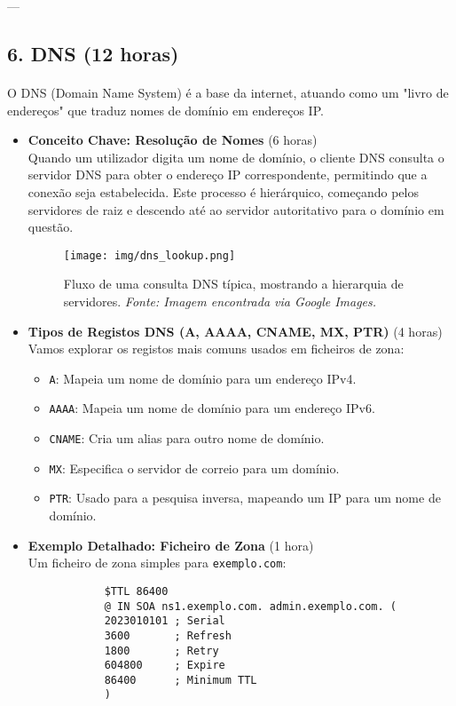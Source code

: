 \documentclass[10pt,a4paper]{article}
\begin{document}
	---
	
	\subsection*{6. DNS (12 horas)}
	\vspace{-1.2em}
	\paragraph{}
	O DNS (Domain Name System) é a base da internet, atuando como um "livro de endereços" que traduz nomes de domínio em endereços IP.
	
	\begin{itemize}
		\item \textbf{Conceito Chave: Resolução de Nomes} (6 horas) \\
		Quando um utilizador digita um nome de domínio, o cliente DNS consulta o servidor DNS para obter o endereço IP correspondente, permitindo que a conexão seja estabelecida. Este processo é hierárquico, começando pelos servidores de raiz e descendo até ao servidor autoritativo para o domínio em questão.
		
		\begin{figure}[h]
			\centering
			\texttt{[image: img/dns\_lookup.png]}
			\caption{Fluxo de uma consulta DNS típica, mostrando a hierarquia de servidores. \textit{Fonte: Imagem encontrada via Google Images.}}
			\label{fig:dns_lookup}
		\end{figure}
		
		\item \textbf{Tipos de Registos DNS (A, AAAA, CNAME, MX, PTR)} (4 horas) \\
		Vamos explorar os registos mais comuns usados em ficheiros de zona:
		\begin{itemize}
			\item \texttt{A}: Mapeia um nome de domínio para um endereço IPv4.
			\item \texttt{AAAA}: Mapeia um nome de domínio para um endereço IPv6.
			\item \texttt{CNAME}: Cria um alias para outro nome de domínio.
			\item \texttt{MX}: Especifica o servidor de correio para um domínio.
			\item \texttt{PTR}: Usado para a pesquisa inversa, mapeando um IP para um nome de domínio.
		\end{itemize}
		
		\item \textbf{Exemplo Detalhado: Ficheiro de Zona} (1 hora) \\
		Um ficheiro de zona simples para \texttt{exemplo.com}:
		\begin{verbatim}
			$TTL 86400
			@ IN SOA ns1.exemplo.com. admin.exemplo.com. (
			2023010101 ; Serial
			3600       ; Refresh
			1800       ; Retry
			604800     ; Expire
			86400      ; Minimum TTL
			)
			

\end{verbatim}
\end{itemize}
\end{document}
